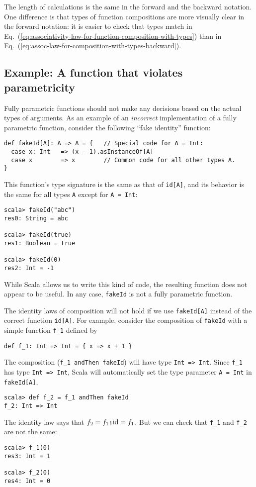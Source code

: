 The length of calculations is the same in the forward and the backward
notation. One difference is that types of function compositions are
more visually clear in the forward notation: it is easier to check
that types match in Eq.~(\ref{eq:associativity-law-for-function-composition-with-types})
than in Eq.~(\ref{eq:assoc-law-for-composition-with-types-backward}).

\subsection{Example: A function that violates parametricity }

Fully parametric functions should not make any decisions based on
the actual types of arguments. As an example of an \emph{incorrect}
implementation of a fully parametric function, consider the following
``fake identity'' function:
\begin{lstlisting}
def fakeId[A]: A => A = {   // Special code for A = Int:
  case x: Int   => (x - 1).asInstanceOf[A]
  case x        => x        // Common code for all other types A.
}
\end{lstlisting}
This function's type signature is the same as that of \lstinline!id[A]!,
and its behavior is the same for all types \lstinline!A! except for
\lstinline!A = Int!:
\begin{lstlisting}
scala> fakeId("abc")
res0: String = abc

scala> fakeId(true)
res1: Boolean = true

scala> fakeId(0)
res2: Int = -1
\end{lstlisting}
While Scala allows us to write this kind of code, the resulting function
does not appear to be useful. In any case, \lstinline!fakeId! is
not a fully parametric function.

The identity laws of composition will not hold if we use \lstinline!fakeId[A]!
instead of the correct function \lstinline!id[A]!. For example, consider
the composition of \lstinline!fakeId! with a simple function \lstinline!f_1!
defined by
\begin{lstlisting}
def f_1: Int => Int = { x => x + 1 }
\end{lstlisting}
The composition (\lstinline!f_1 andThen fakeId!) will have type \lstinline!Int => Int!.
Since \lstinline!f_1! has type \lstinline!Int => Int!, Scala will
automatically set the type parameter \lstinline!A = Int! in \lstinline!fakeId[A]!,
\begin{lstlisting}
scala> def f_2 = f_1 andThen fakeId
f_2: Int => Int
\end{lstlisting}
The identity law says that $f_{2}=f_{1}\bef\text{id}=f_{1}$. But
we can check that \lstinline!f_1! and \lstinline!f_2! are not the
same:
\begin{lstlisting}
scala> f_1(0)
res3: Int = 1

scala> f_2(0)
res4: Int = 0
\end{lstlisting}


